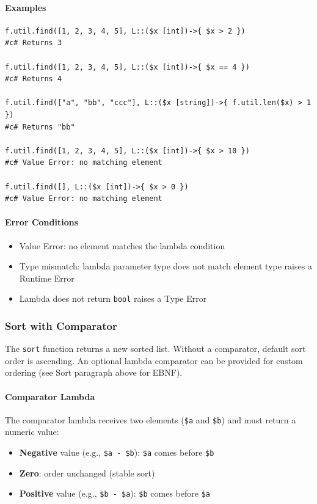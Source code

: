 \paragraph{Examples}
\begin{verbatim}
f.util.find([1, 2, 3, 4, 5], L::($x [int])->{ $x > 2 })
#c# Returns 3

f.util.find([1, 2, 3, 4, 5], L::($x [int])->{ $x == 4 })
#c# Returns 4

f.util.find(["a", "bb", "ccc"], L::($x [string])->{ f.util.len($x) > 1 })
#c# Returns "bb"

f.util.find([1, 2, 3, 4, 5], L::($x [int])->{ $x > 10 })
#c# Value Error: no matching element

f.util.find([], L::($x [int])->{ $x > 0 })
#c# Value Error: no matching element
\end{verbatim}

\paragraph{Error Conditions}
\begin{itemize}
\item Value Error: no element matches the lambda condition
\item Type mismatch: lambda parameter type does not match element type raises a Runtime Error
\item Lambda does not return \texttt{bool} raises a Type Error
\end{itemize}

\subsubsection{Sort with Comparator}
The \texttt{sort} function returns a new sorted list. Without a comparator, default sort order is ascending. An optional lambda comparator can be provided for custom ordering (see Sort paragraph above for EBNF).

\paragraph{Comparator Lambda}
The comparator lambda receives two elements (\texttt{\$a} and \texttt{\$b}) and must return a numeric value:
\begin{itemize}
\item \textbf{Negative} value (e.g., \texttt{\$a - \$b}): \texttt{\$a} comes before \texttt{\$b}
\item \textbf{Zero}: order unchanged (stable sort)
\item \textbf{Positive} value (e.g., \texttt{\$b - \$a}): \texttt{\$b} comes before \texttt{\$a}
\end{itemize}


